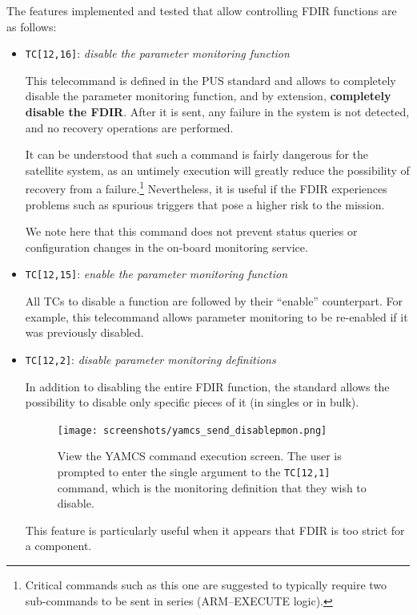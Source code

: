 \documentclass[a4paper,nobib]{tufte-book}
\begin{document}
The features implemented and tested that allow controlling \acs{FDIR} functions are as follows:
\begin{itemize}
	\item \texttt{TC[12,16]}: \emph{disable the parameter monitoring function}
	
	This telecommand is defined in the \acs{PUS} standard and allows to completely disable the parameter monitoring function, and by extension, \textbf{completely disable the \acs{FDIR}}. After it is sent, any failure in the system is not detected, and no recovery operations are performed.
	
	It can be understood that such a command is fairly dangerous for the satellite system, as an untimely execution will greatly reduce the possibility of recovery from a failure.\footnote{Critical commands such as this one are suggested to typically require two sub-commands to be sent in series (ARM--EXECUTE logic).} Nevertheless, it is useful if the \acs{FDIR} experiences problems such as spurious triggers that pose a higher risk to the mission.
	
	We note here that this command does not prevent status queries or configuration changes in the on-board monitoring service.
	
	\item \texttt{TC[12,15]}: \emph{enable the parameter monitoring function}
	
	All \acsp{TC} to disable a function are followed by their ``enable'' counterpart. For example, this telecommand allows parameter monitoring to be re-enabled if it was previously disabled.

	\item \texttt{TC[12,2]}: \emph{disable parameter monitoring definitions}
	
	In addition to disabling the entire \acs{FDIR} function, the standard allows the possibility to disable only specific pieces of it (in singles or in bulk).
	
	\begin{figure}[h]
		\texttt{[image: screenshots/yamcs\_send\_disablepmon.png]}
		\caption[View the \acs{YAMCS} command execution screen]{View the \acs{YAMCS} command execution screen. The user is prompted to enter the single argument to the \texttt{TC[12,1]} command, which is the monitoring definition that they wish to disable.}
		\label{fig:yamcssenddisablepmon}
	\end{figure}
	
	This feature is particularly useful when it appears that \acs{FDIR} is too strict for a component.
	

\end{itemize}
\end{document}
